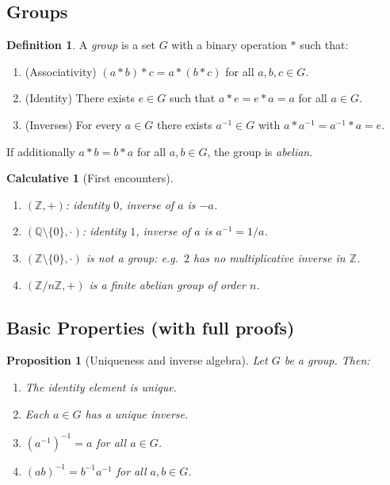 \documentclass[12pt]{article}
\newtheorem{proposition}[theorem]{Proposition}
\newtheorem{calculative}[theorem]{Calculative}
\theoremstyle{definition}
\newtheorem{definition}{Definition}
\begin{document}
\subsection*{Groups}

\begin{definition}
A \emph{group} is a set $G$ with a binary operation $*$ such that:
\begin{enumerate}
    \item (Associativity) $(a*b)*c=a*(b*c)$ for all $a,b,c\in G$.
    \item (Identity) There exists $e\in G$ such that $a*e=e*a=a$ for all $a\in G$.
    \item (Inverses) For every $a\in G$ there exists $a^{-1}\in G$ with $a*a^{-1}=a^{-1}*a=e$.
\end{enumerate}
If additionally $a*b=b*a$ for all $a,b\in G$, the group is \emph{abelian}.
\end{definition}

\begin{calculative}[First encounters]
\begin{enumerate}
    \item $(\mathbb{Z},+)$: identity $0$, inverse of $a$ is $-a$.
    \item $(\mathbb{Q}\setminus\{0\},\cdot)$: identity $1$, inverse of $a$ is $a^{-1}=1/a$.
    \item $(\mathbb{Z}\setminus\{0\},\cdot)$ is not a group: e.g.\ $2$ has no multiplicative inverse in $\mathbb{Z}$.
    \item $(\mathbb{Z}/n\mathbb{Z},+)$ is a finite abelian group of order $n$.
\end{enumerate}
\end{calculative}

\subsection*{Basic Properties (with full proofs)}

\begin{proposition}[Uniqueness and inverse algebra]
Let $G$ be a group. Then:
\begin{enumerate}
    \item The identity element is unique.
    \item Each $a\in G$ has a unique inverse.
    \item $(a^{-1})^{-1}=a$ for all $a\in G$.
    \item $(ab)^{-1}=b^{-1}a^{-1}$ for all $a,b\in G$.
\end{enumerate}
\end{proposition}
\end{document}
